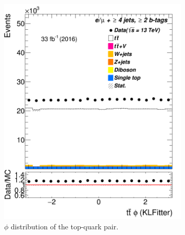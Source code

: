 \begin{figure}
\begin{subfigure}{0.25\textwidth}
		\includegraphics[width=\linewidth]{ControlPlots_emujets_2016_4incl_2incl/klf_ttbar_phi_emujets_2016.png}
		\caption{$\phi$  distribution of the top-quark pair.                       } \label{fig:K19}
	\end{subfigure}
\hspace*{0.5cm}
	\begin{subfigure}{0.25\textwidth}

\end{subfigure}
\end{figure}
